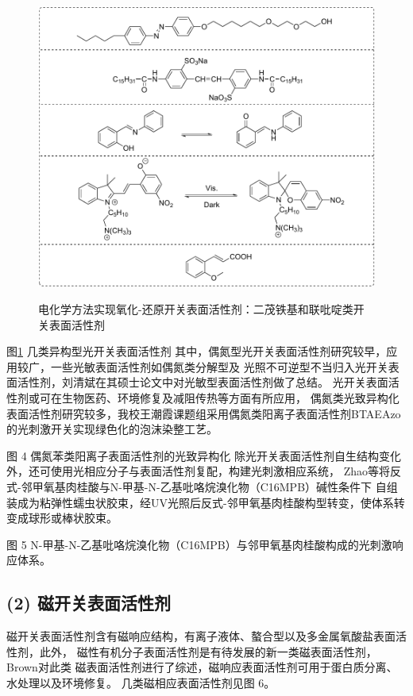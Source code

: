 \documentclass[bachelor,fandolfonts,replaceperiod]{jnuthesis} %
\begin{document}
    \begin{figure}[htbp]
        \centering
        \includegraphics[scale=0.8]{Figure/switchable-light.pdf}\\
        \caption{电化学方法实现氧化-还原开关表面活性剂：二茂铁基和联吡啶类开关表面活性剂}\label{fig:switchable-light}
    \end{figure}
    
    图\ref{fig:switchable-light} 几类异构型光开关表面活性剂\cite{张冤帝2017,karthaus1996,shang2003,吕湘亮2018}
    其中，偶氮型光开关表面活性剂研究较早，应用较广，一些光敏表面活性剂如偶氮类分解型及
    光照不可逆型不当归入光开关表面活性剂，刘清斌在其硕士论文中对光敏型表面活性剂做了总结\cite{刘清斌2018}。
    光开关表面活性剂或可在生物医药、环境修复及减阻传热等方面有所应用\cite{刘清斌2018}，
    偶氮类光致异构化表面活性剂研究较多，我校王潮霞课题组\cite{chen2016}采用偶氮类阳离子表面活性剂BTAEAzo的光刺激开关实现绿色化的泡沫染整工艺。
    
    图 4 偶氮苯类阳离子表面活性剂的光致异构化\cite{chen2016}
    除光开关表面活性剂自生结构变化外，还可使用光相应分子与表面活性剂复配，构建光刺激相应系统，
    Zhao等\cite{zhao2016}将反式-邻甲氧基肉桂酸与N-甲基-N-乙基吡咯烷溴化物（C16MPB）碱性条件下
    自组装成为粘弹性蠕虫状胶束，经UV光照后反式-邻甲氧基肉桂酸构型转变，使体系转变成球形或棒状胶束。
    
    图 5 N-甲基-N-乙基吡咯烷溴化物（C16MPB）与邻甲氧基肉桂酸构成的光刺激响应体系\cite{zhao2016}。
    
    \subsection*{(2) 磁开关表面活性剂}
    磁开关表面活性剂含有磁响应结构，有离子液体、螯合型以及多金属氧酸盐表面活性剂，此外，
    磁性有机分子表面活性剂是有待发展的新一类磁表面活性剂\cite{brown2015}，Brown\cite{brown2015}对此类
    磁表面活性剂进行了综述，磁响应表面活性剂可用于蛋白质分离、水处理以及环境修复\cite{brown2015}。
    几类磁相应表面活性剂见图 6。
    
\end{document}
